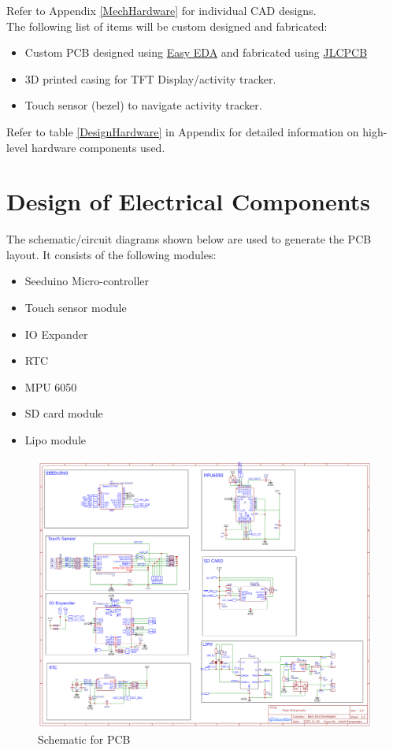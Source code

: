 \documentclass[12pt, titlepage]{article}
\begin{document}
Refer to Appendix \ref{MechHardware} for individual CAD designs.\\

The following list of items will be custom designed and fabricated:
\begin{itemize}
\item{Custom PCB designed using \href{https://easyeda.com/}{Easy EDA} and fabricated using \href{https://jlcpcb.com/}{JLCPCB}}
\item{3D printed casing for TFT Display/activity tracker.}
\item{Touch sensor (bezel) to navigate activity tracker.}
\end{itemize}

Refer to table \ref{DesignHardware} in Appendix for detailed information on high-level hardware components used.

\section{Design of Electrical Components} \label{dEC}

The schematic/circuit diagrams shown below are used to generate the PCB layout. It consists of the following modules:
\begin{itemize}
\item Seeduino Micro-controller
\item Touch sensor module
\item IO Expander
\item RTC
\item MPU 6050
\item SD card module
\item Lipo module
\end{itemize}

\begin{figure}[H]
	\begin{center}
		 \includegraphics[width=1\textwidth]{Schematic}
		\caption{Schematic for PCB}
		\label{Schematic} 
	\end{center}
\end{figure}
\end{document}
